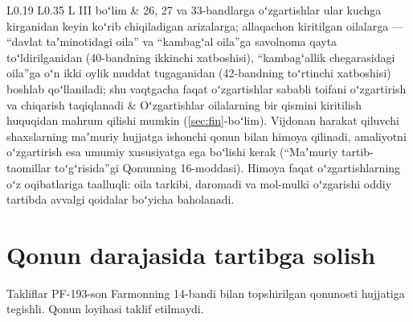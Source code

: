 \documentclass[14pt,a4paper]{extarticle}
\begin{document}
\begin{longtable}{L{0.19\linewidth} L{0.35\linewidth} L{\tabcolsep}}
III boʻlim & 26, 27 va 33-bandlarga oʻzgartishlar ular kuchga kirganidan keyin koʻrib chiqiladigan arizalarga; allaqachon kiritilgan oilalarga — “davlat taʼminotidagi oila” va “kambagʻal oila”ga savolnoma qayta toʻldirilganidan (40-bandning ikkinchi xatboshisi), “kambagʻallik chegarasidagi oila”ga oʻn ikki oylik muddat tugaganidan (42-bandning toʻrtinchi xatboshisi) boshlab qoʻllaniladi; shu vaqtgacha faqat oʻzgartishlar sababli toifani oʻzgartirish va chiqarish taqiqlanadi & Oʻzgartishlar oilalarning bir qismini kiritilish huquqidan mahrum qilishi mumkin (\ref{sec:fin}-boʻlim). Vijdonan harakat qiluvchi shaxslarning maʼmuriy hujjatga ishonchi qonun bilan himoya qilinadi, amaliyotni oʻzgartirish esa umumiy xususiyatga ega boʻlishi kerak (“Maʼmuriy tartib-taomillar toʻgʻrisida”gi Qonunning 16-moddasi\cite{apl}). Himoya faqat oʻzgartishlarning oʻz oqibatlariga taalluqli: oila tarkibi, daromadi va mol-mulki oʻzgarishi oddiy tartibda avvalgi qoidalar boʻyicha baholanadi.\\
\bottomrule
\end{longtable}\endgroup

\section{Qonun darajasida tartibga solish}
Takliflar PF-193-son Farmonning 14-bandi bilan topshirilgan qonunosti hujjatiga tegishli. Qonun loyihasi taklif etilmaydi.
\end{document}
